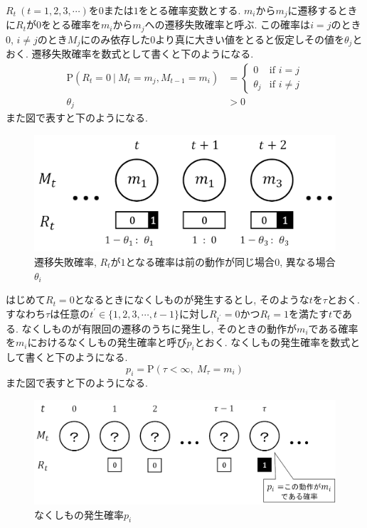 $ R_t\ (t=1,2,3,\cdots) $を$ 0 $または$ 1 $をとる確率変数とする. 
$ m_i $から$ m_j $に遷移するときに$ R_t $が$ 0 $をとる確率を$ m_i $から$ m_j $への遷移失敗確率と呼ぶ. 
この確率は$ i = j $のとき$ 0 $, $ i \ne j $のとき$ M_j $にのみ依存した$ 0 $より真に大きい値をとると仮定しその値を$ \theta_j $とおく. %
遷移失敗確率を数式として書くと下のようになる. 
\begin{align}
    \mathrm{P}(R_t = 0\ |\ M_t = m_j , M_{t - 1} = m_i) &=
    \begin{cases}
        0        & \text{if $i = j$}\\
        \theta_j & \text{if $i \ne j$}
    \end{cases} \\
    \theta_j &> 0
\end{align}
また図で表すと下のようになる. 
\begin{figure}[H]
    \begin{center}
    \includegraphics[width=0.8\linewidth]{figs/miss_prob.png}
    \caption{遷移失敗確率, $R_t$が$1$となる確率は前の動作が同じ場合$0$, 異なる場合$\theta_i$}
    \label{fig:r}
    \end{center}
\end{figure}

はじめて$ R_t = 0 $となるときになくしものが発生するとし, そのような$ t $を$ \tau $とおく. 
すなわち$ \tau $は任意の$ t^{\prime} \in \{1,2,3,\cdots,t-1\} $に対し$ R_{t^{\prime}} = 0 $かつ$ R_t = 1 $を満たす$ t $である. 
なくしものが有限回の遷移のうちに発生し, そのときの動作が$ m_i $である確率を$ m_i $におけるなくしもの発生確率と呼び$ p_i $とおく. 
なくしもの発生確率を数式として書くと下のようになる. 
\begin{equation}
    p_i = \mathrm{P}(\tau < \infty,\ M_{\tau} = m_i)
\end{equation}
また図で表すと下のようになる. 
\begin{figure}[H]
    \begin{center}
    \includegraphics[width=1.0\linewidth]{figs/lost_prob.png}
    \caption{なくしもの発生確率$p_i$}
    \label{fig:p}
    \end{center}
\end{figure}

